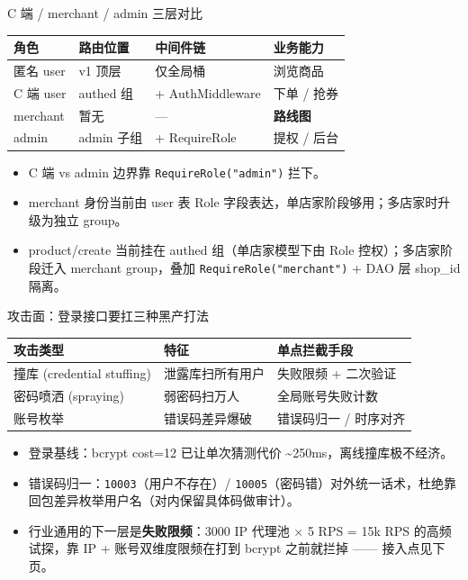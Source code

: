 \documentclass[aspectratio=169,11pt]{beamer}
\begin{document}
\begin{frame}[shrink]{C 端 / merchant / admin 三层对比}
\begin{tabular}{@{}llll@{}}
\toprule
角色 & 路由位置 & 中间件链 & 业务能力 \\
\midrule
匿名 user      & v1 顶层      & 仅全局桶            & 浏览商品 \\
C 端 user      & authed 组    & + AuthMiddleware    & 下单 / 抢券 \\
merchant       & 暂无         & ---                  & \textbf{路线图} \\
admin          & admin 子组   & + RequireRole       & 提权 / 后台 \\
\bottomrule
\end{tabular}
\vspace{2mm}
\begin{itemize}
  \item C 端 vs admin 边界靠 \texttt{RequireRole("admin")} 拦下。
  \item merchant 身份当前由 user 表 Role 字段表达，单店家阶段够用；多店家时升级为独立 group。
  \item product/create 当前挂在 authed 组（单店家模型下由 Role 控权）；多店家阶段迁入 merchant group，叠加 \texttt{RequireRole("merchant")} + DAO 层 shop\_id 隔离。
\end{itemize}
\end{frame}

\begin{frame}[shrink]{攻击面：登录接口要扛三种黑产打法}
\begin{tabular}{@{}lll@{}}
\toprule
攻击类型 & 特征 & 单点拦截手段 \\
\midrule
撞库 (credential stuffing) & 泄露库扫所有用户 & 失败限频 + 二次验证 \\
密码喷洒 (spraying)       & 弱密码扫万人      & 全局账号失败计数 \\
账号枚举                  & 错误码差异爆破     & 错误码归一 / 时序对齐 \\
\bottomrule
\end{tabular}
\vspace{2mm}
\begin{itemize}
  \item 登录基线：bcrypt cost=12 已让单次猜测代价 \textasciitilde 250ms，离线撞库极不经济。
  \item 错误码归一：\texttt{10003}（用户不存在）/ \texttt{10005}（密码错）对外统一话术，杜绝靠回包差异枚举用户名（对内保留具体码做审计）。
  \item 行业通用的下一层是\textbf{失败限频}：3000 IP 代理池 × 5 RPS = 15k RPS 的高频试探，靠 IP + 账号双维度限频在打到 bcrypt 之前就拦掉 —— 接入点见下页。
\end{itemize}
\end{frame}
\end{document}
